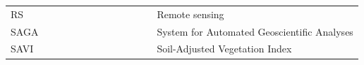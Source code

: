 \documentclass[jimaging,article,accept,pdftex,moreauthors]{Definitions/mdpi}
\begin{document}
{\noindent 
\begin{tabular}{@{}ll}
{RS} & ~~~~~~~~~~~~~~~~~~~~~~Remote sensing \\
SAGA & ~~~~~~~~~~~~~~~~~~~~~~System for Automated Geoscientific Analyses \\
SAVI & ~~~~~~~~~~~~~~~~~~~~~~Soil-Adjusted Vegetation Index \\

\end{tabular}}
\end{document}
